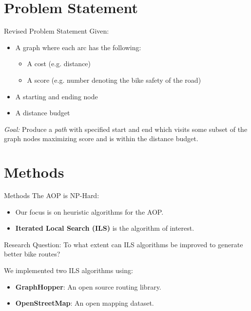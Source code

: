 \documentclass{beamer}
\begin{document}
\section{Problem Statement}
\begin{frame}{Revised Problem Statement}
Given:
\begin{itemize}
    \item A graph where each arc has the following:
    \begin{itemize}
        \item A cost (e.g. distance)
        \item A score (e.g. number denoting the bike safety of the road)
    \end{itemize}
    \item A starting and ending node
    \item A distance budget
\end{itemize}
\emph{Goal:} Produce a \emph{path} with specified start and end which visits some subset of the graph nodes maximizing score and is within the distance budget.
\end{frame}

\section{Methods}
\begin{frame}{Methods}
    The AOP is NP-Hard:
    \begin{itemize}
        \item Our focus is on heuristic algorithms for the AOP.
        \item \textbf{Iterated Local Search (ILS)} is the algorithm of interest.
    \end{itemize}
    
    \begin{alertblock}{Research Question:}
        To what extent can ILS algorithms be improved to generate better bike routes?
    \end{alertblock}
    \vspace{0.3cm}
    We implemented two ILS algorithms using:
    \begin{itemize}
        \item \textbf{GraphHopper}: An open source routing library.
        \item \textbf{OpenStreetMap}: An open mapping dataset.
    \end{itemize}
    

\end{frame}
\end{document}
